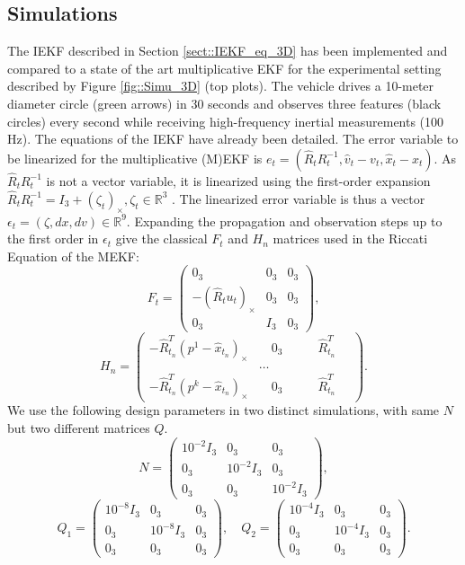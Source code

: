 \documentclass[a4paper,12pt,onecolumn]{article}
\begin{document}
\subsection{Simulations}

The IEKF described in Section \ref{sect::IEKF_eq_3D} has been implemented and compared to a state of the art multiplicative EKF \cite{lefferts1982kalman} for the experimental setting described by Figure \ref{fig::Simu_3D} (top plots). The vehicle drives a 10-meter diameter circle (green arrows) in 30 seconds and observes three features (black circles) every second while receiving high-frequency inertial measurements (100 Hz).  The equations of the IEKF have already been detailed. The error variable to be linearized for the multiplicative (M)EKF is $e_t=(\hat R_t R_t^{-1}, \hat v_t - v_t, \hat x_t - x_t)$. As $\hat R_t R_t^{-1}$ is not a vector variable,  it is linearized using the first-order expansion  $\hat R_t R_t^{-1} = I_3 + \left( \zeta_t \right)_{\times}, \zeta_t \in \mathbb{R}^3$ \cite{lefferts1982kalman}. The linearized error variable is thus a vector $ \epsilon_t = \left( \zeta, dx, dv \right) \in \mathbb{R}^9$. Expanding the propagation and observation steps up to the first order in $\epsilon_t$ give the classical $F_t$ and $H_n$ matrices used in the Riccati Equation of the MEKF:
 $$
F_t = \begin{pmatrix}
0_3 & 0_3 & 0_3 \\
- \left( \hat R_t u_t \right)_\times & 0_3 & 0_3 \\
0_3 & I_3 & 0_3
\end{pmatrix},
$$
$$
H_n = 
\begin{pmatrix}
-\hat R_{t_n}^T \left( p^1 - \hat x_{t_n} \right)_{\times} & \quad 0_3 \quad & \quad \hat R_{t_n}^T \quad \\
 & \ldots &  \\
-\hat R_{t_n}^T \left( p^k - \hat x_{t_n} \right)_{\times} & \quad 0_3 \quad & \quad \hat R_{t_n}^T \quad
\end{pmatrix}.
$$
We use the following design parameters in two distinct simulations, with same $N$ but two different matrices $Q$.
$$
N = \begin{pmatrix}10^{-2} I_3 & 0_3 & 0_3 \\ 0_3 & 10^{-2} I_3 & 0_3 \\ 0_3 & 0_3 & 10^{-2} I_3 \end{pmatrix},
$$
$$
Q_1 = \begin{pmatrix} 10^{-8} I_3 & 0_3 & 0_3 \\ 0_3 & 10^{-8} I_3 & 0_3 \\ 0_3 & 0_3 & 0_3 \end{pmatrix},
\quad
Q_2 = \begin{pmatrix} 10^{-4} I_3 & 0_3 & 0_3 \\ 0_3 & 10^{-4} I_3 & 0_3 \\ 0_3 & 0_3 & 0_3 \end{pmatrix}.
$$
\end{document}
